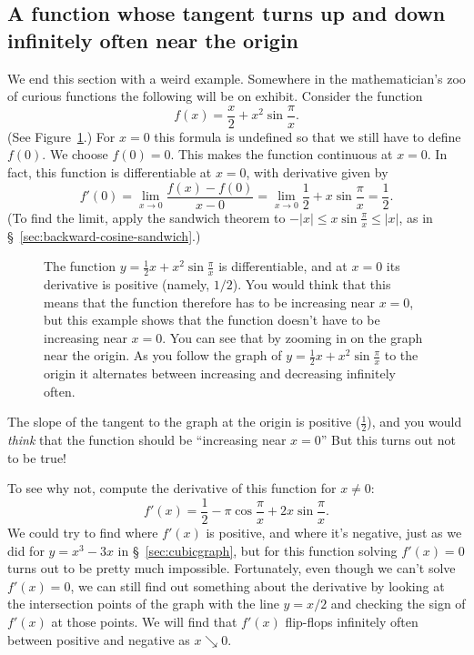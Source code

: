 \subsection{A function whose tangent turns up and down infinitely often near the origin} %
We end this section with a weird example.  Somewhere in the mathematician's zoo
of curious functions the following will be on exhibit.  Consider the function
\[
f(x) = \frac x2+x^2\sin\frac\pi x.
\]
(See Figure~\ref{fig:05zigzagBetweenParabolas}.)  For $x=0$ this
formula is undefined so that we still have to define $f(0)$.  We
choose $f(0)=0$.  This makes the function continuous at $x=0$. In
fact, this function is differentiable at $ x=0 $, with derivative
given by
\[
f'(0) = \lim_{x\to 0}\frac{f(x)-f(0)}{x-0} =\lim_{x\to0} \frac12+x\sin\frac\pi
x=\frac12.
\]
(To find the limit, apply the sandwich theorem to $-|x| \leq
x\sin\tfrac\pi x \leq |x|$, as in \S~\ref{sec:backward-cosine-sandwich}.)
\begin{figure}[t]
  \centering 
  \caption{The function $y = \frac12 x+ x^{2}\sin\frac\pi x$ is
    differentiable, and at $x=0$ its derivative is positive (namely,
    $1/2$).  You would think that this means that the function
    therefore has to be increasing near $x=0$, but this example shows
    that the function doesn't have to be increasing near $x=0$.  You
    can see that by zooming in on the graph near the origin.  As you
    follow the graph of $y = \frac12 x+ x^{2}\sin\frac\pi x$ to the
    origin it alternates between increasing and decreasing infinitely
    often.  \label{fig:05zigzagBetweenParabolas}}
\end{figure}




\noindent
The slope of the tangent to the graph at the origin is positive
($\frac12$), and you would \textit{think} that the function should be
``increasing near $x=0$'' But this turns out not to be true!

To see why not, compute the derivative of this function for
$x\neq0$:
\[
f'(x) = \frac12-\pi\cos\frac\pi x+2x\sin\frac\pi x.
\]
We could try to find where $f'(x)$ is positive, and where it's negative, just as
we did for $y=x^3-3x$ in \S~\ref{sec:cubicgraph}, but for this function solving
$f'(x)=0$ turns out to be pretty much impossible.  Fortunately, even though we
can't solve $f'(x) = 0$, we can still find out something about the derivative by
looking at the intersection points of the graph with the line $y=x/2$ and
checking the sign of $f'(x)$ at those points.  We will find that $f'(x)$
flip-flops infinitely often between positive and negative as $x \searrow 0$.  




